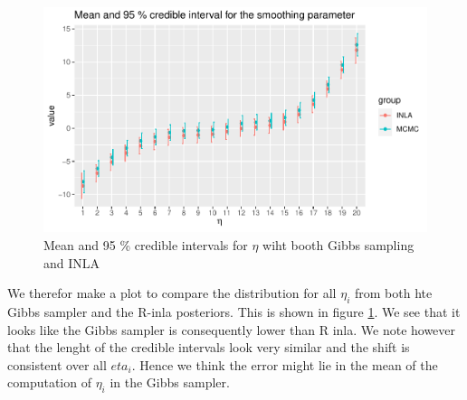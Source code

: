 \begin{figure}[H]
    \centering
    \includegraphics[width=\textwidth]{Images/smoothing_comparison_all eta.pdf}
    \caption{Mean and 95 \% credible intervals for $\eta$ wiht booth Gibbs sampling and INLA}
    \label{fig:eta_all_comp}
\end{figure}

We therefor make a plot to compare the distribution for all $\eta_i$ from both hte Gibbs sampler and the R-inla posteriors. This is shown in figure \ref{fig:eta_all_comp}. We see that it looks like the Gibbs sampler is consequently lower than R inla. We note however that the lenght of the credible intervals look very similar and the shift is consistent over all $eta_i$. Hence we think the error might lie in the mean of the computation of $\eta_i$ in the Gibbs sampler.  